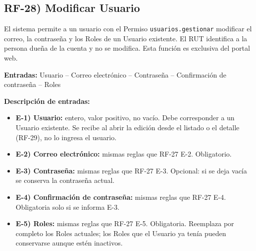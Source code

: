 \subsection*{RF-28) Modificar Usuario}
El sistema permite a un usuario con el Permiso \texttt{usuarios.gestionar} modificar el correo, la contrase\~na y los Roles de un Usuario existente. El RUT identifica a la persona due\~na de la cuenta y no se modifica. Esta funci\'on es exclusiva del portal web.

\textbf{Entradas:} Usuario -- Correo electr\'onico -- Contrase\~na -- Confirmaci\'on de contrase\~na -- Roles

\textbf{Descripci\'on de entradas:}
\begin{itemize}[label={}, leftmargin=1.5em]
  \item \textbf{E-1) Usuario:} entero, valor positivo, no vac\'io. Debe corresponder a un Usuario existente. Se recibe al abrir la edici\'on desde el listado o el detalle (RF-29), no lo ingresa el usuario.
  \item \textbf{E-2) Correo electr\'onico:} mismas reglas que RF-27 E-2. Obligatorio.
  \item \textbf{E-3) Contrase\~na:} mismas reglas que RF-27 E-3. Opcional: si se deja vac\'ia se conserva la contrase\~na actual.
  \item \textbf{E-4) Confirmaci\'on de contrase\~na:} mismas reglas que RF-27 E-4. Obligatoria solo si se informa E-3.
  \item \textbf{E-5) Roles:} mismas reglas que RF-27 E-5. Obligatoria. Reemplaza por completo los Roles actuales; los Roles que el Usuario ya ten\'ia pueden conservarse aunque est\'en inactivos.
\end{itemize}

